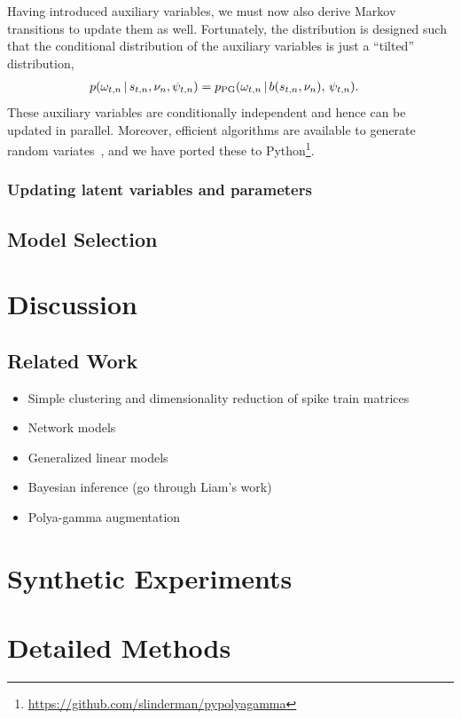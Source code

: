 Having introduced auxiliary variables, we must now also derive
Markov transitions to update them as well. Fortunately, the
\polyagamma distribution is designed such that the conditional
distribution of the auxiliary variables is just a ``tilted'' \polyagamma
distribution,
\begin{align}
  p(\omega_{t,n} \,|\, s_{t,n}, \nu_n, \psi_{t,n})
  &= p_{\mathrm{PG}}(\omega_{t,n} \,|\, b(s_{t,n}, \nu_n), \, \psi_{t,n}).
\end{align}
These auxiliary variables are conditionally independent and hence can
be updated in parallel. Moreover, efficient algorithms are available
to generate \polyagamma random variates~\cite{windle2014sampling}, and
we have ported these to Python\footnote{\url{https://github.com/slinderman/pypolyagamma}}.

\subsubsection{Updating latent variables and parameters}


\subsection{Model Selection}


\section{Discussion}

\subsection{Related Work}
\begin{itemize}
\item Simple clustering and dimensionality reduction of spike train matrices
\item Network models
\item Generalized linear models
\item Bayesian inference (go through Liam's work)
\item Polya-gamma augmentation
\end{itemize}


\section{Synthetic Experiments}

\section{Detailed Methods}

